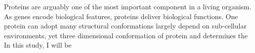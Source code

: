 Proteins are arguably one of the most important component in a living organism. As genes encode biological features, proteins deliver biological functions. One protein can adopt many structural conformations largely depend on sub-cellular environments, yet three dimensional conformation of protein and  determines the     In this study, I will be 